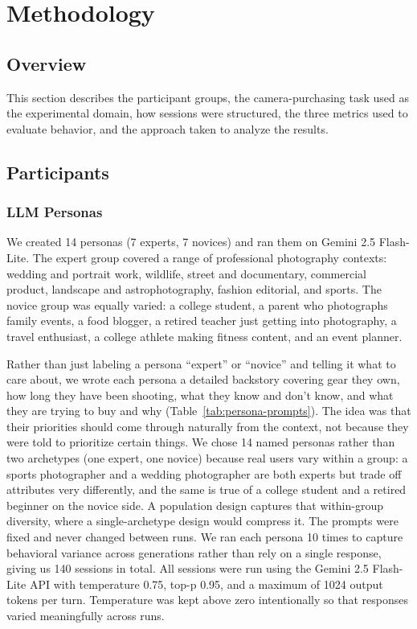 \documentclass{sigchi-ext}
\begin{document}
\section{Methodology}

\subsection{Overview}
This section describes the participant groups, the camera-purchasing task used as the experimental domain, how sessions were structured, the three metrics used to evaluate behavior, and the approach taken to analyze the results.

\subsection{Participants}

\subsubsection{LLM Personas}
We created 14 personas (7 experts, 7 novices) and ran them on Gemini 2.5 Flash-Lite. The expert group covered a range of professional photography contexts: wedding and portrait work, wildlife, street and documentary, commercial product, landscape and astrophotography, fashion editorial, and sports. The novice group was equally varied: a college student, a parent who photographs family events, a food blogger, a retired teacher just getting into photography, a travel enthusiast, a college athlete making fitness content, and an event planner.

Rather than just labeling a persona ``expert'' or ``novice'' and telling it what to care about, we wrote each persona a detailed backstory covering gear they own, how long they have been shooting, what they know and don't know, and what they are trying to buy and why (Table~\ref{tab:persona-prompts}). The idea was that their priorities should come through naturally from the context, not because they were told to prioritize certain things. We chose 14 named personas rather than two archetypes (one expert, one novice) because real users vary within a group: a sports photographer and a wedding photographer are both experts but trade off attributes very differently, and the same is true of a college student and a retired beginner on the novice side. A population design captures that within-group diversity, where a single-archetype design would compress it. The prompts were fixed and never changed between runs. We ran each persona 10 times to capture behavioral variance across generations rather than rely on a single response, giving us 140 sessions in total. All sessions were run using the Gemini 2.5 Flash-Lite API with temperature 0.75, top-p 0.95, and a maximum of 1024 output tokens per turn. Temperature was kept above zero intentionally so that responses varied meaningfully across runs.
\end{document}
